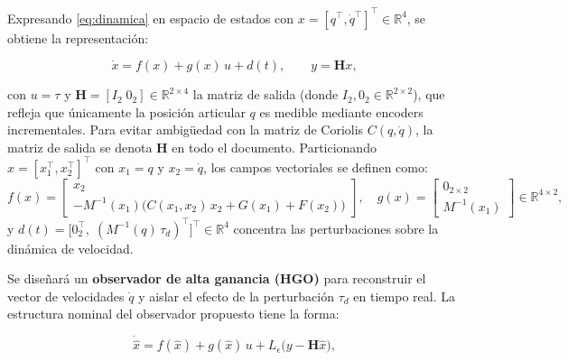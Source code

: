 \documentclass[a4paper,12pt]{article}
\begin{document}
Expresando \eqref{eq:dinamica} en espacio de estados con $x=[q^{\top},\dot{q}^{\top}]^{\top}\in\mathbb{R}^{4}$, se obtiene la representación:

\begin{equation}
    \dot{x} = f(x) + g(x)\,u + d(t), \qquad y = \mathbf{H}x,
    \label{eq:estadoesp}
\end{equation}

\noindent con $u=\tau$ y $\mathbf{H}=[I_{2}\;0_{2}]\in\mathbb{R}^{2\times 4}$ la matriz de salida (donde $I_{2},0_{2}\in\mathbb{R}^{2\times 2}$), que refleja que únicamente la posición articular $q$ es medible mediante encoders incrementales. Para evitar ambigüedad con la matriz de Coriolis $C(q,\dot{q})$, la matriz de salida se denota $\mathbf{H}$ en todo el documento. Particionando $x=[x_1^{\top},x_2^{\top}]^{\top}$ con $x_1=q$ y $x_2=\dot{q}$, los campos vectoriales se definen como:
\begin{equation}
    f(x) = \begin{bmatrix} x_2 \\ -M^{-1}(x_1)\bigl(C(x_1,x_2)\,x_2 + G(x_1) + F(x_2)\bigr) \end{bmatrix},\quad
    g(x) = \begin{bmatrix} 0_{2\times 2} \\ M^{-1}(x_1) \end{bmatrix}\in\mathbb{R}^{4\times 2},
    \label{eq:fg}
\end{equation}
y $d(t)=\bigl[0_{2}^{\top},\;(M^{-1}(q)\,\tau_d)^{\top}\bigr]^{\top}\in\mathbb{R}^{4}$ concentra las perturbaciones sobre la dinámica de velocidad.

Se diseñará un \textbf{observador de alta ganancia (HGO)} para reconstruir el vector de velocidades $\dot{q}$ y aislar el efecto de la perturbación $\tau_d$ en tiempo real. La estructura nominal del observador propuesto tiene la forma:

\begin{equation}
    \dot{\hat{x}} = f(\hat{x}) + g(\hat{x})\,u + L_{\epsilon}\bigl(y - \mathbf{H}\hat{x}\bigr),
    \label{eq:observador}
\end{equation}
\end{document}
